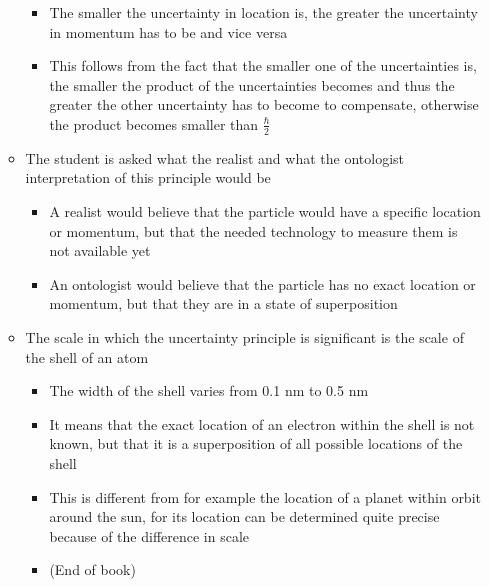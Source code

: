 \documentclass[11pt,twoside]{report} %
\begin{document}
\begin{itemize}
\begin{itemize}
\begin{itemize}
			\item The smaller the uncertainty in location is, the greater the uncertainty in momentum has to be and vice versa
			\item This follows from the fact that the smaller one of the uncertainties is, the smaller the product of the uncertainties becomes and thus the greater the other uncertainty has to become to compensate, otherwise the product becomes smaller than $\frac{\hbar}{2}$
		\end{itemize}
		\item The student is asked what the realist and what the ontologist interpretation of this principle would be
		\begin{itemize}
			\item A realist would believe that the particle would have a specific location or momentum, but that the needed technology to measure them is not available yet
			\item An ontologist would believe that the particle has no exact location or momentum, but that they are in a state of superposition
		\end{itemize}
		\item The scale in which the uncertainty principle is significant is the scale of the shell of an atom
		\begin{itemize}
			\item The width of the shell varies from 0.1 nm to 0.5 nm
			\item It means that the exact location of an electron within the shell is not known, but that it is a superposition of all possible locations of the shell
			\item This is different from for example the location of a planet within orbit around the sun, for its location can be determined quite precise because of the difference in scale
			\item (End of book)
		\end{itemize}
	\end{itemize}
\end{itemize}
\end{document}
